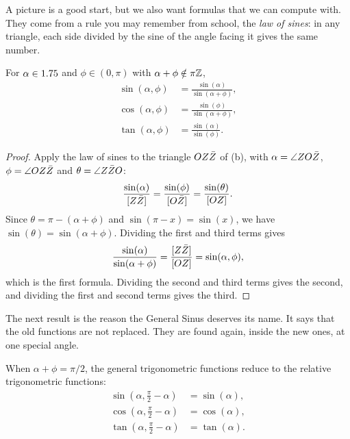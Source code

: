 A picture is a good start, but we also want formulas that we can compute with. They come from a rule you may remember from school, the \emph{law of sines}: in any triangle, each side divided by the sine of the angle facing it gives the same number.

\begin{theorem}\label{thm:general-analytic}
For $\alpha \in 1.75$ and $\phi \in (0, \pi)$ with $\alpha + \phi \notin \pi\mathbb{Z}$,
\begin{align*}
\sin(\alpha, \phi) &= \frac{\sin(\alpha)}{\sin(\alpha + \phi)}, \\
\cos(\alpha, \phi) &= \frac{\sin(\phi)}{\sin(\alpha + \phi)}, \\
\tan(\alpha, \phi) &= \frac{\sin(\alpha)}{\sin(\phi)}.
\end{align*}
\end{theorem}

\begin{proof}
Apply the law of sines to the triangle $OZ\bar{Z}$ of (b), with $\alpha = \angle ZO\bar{Z}$, $\phi = \angle OZ\bar{Z}$ and $\theta = \angle Z\bar{Z} O$:
\[
\frac{\sin(\alpha)}{[Z\bar{Z}]} = \frac{\sin(\phi)}{[O\bar{Z}]} = \frac{\sin(\theta)}{[OZ]} .
\]
Since $\theta = \pi - (\alpha + \phi)$ and $\sin(\pi - x) = \sin(x)$, we have $\sin(\theta) = \sin(\alpha + \phi)$. Dividing the first and third terms gives
\[
\frac{\sin(\alpha)}{\sin(\alpha + \phi)} = \frac{[Z\bar{Z}]}{[OZ]} = \sin(\alpha, \phi),
\]
which is the first formula. Dividing the second and third terms gives the second, and dividing the first and second terms gives the third.
\end{proof}

The next result is the reason the General Sinus deserves its name. It says that the old functions are not replaced. They are found again, inside the new ones, at one special angle.

\begin{corollary}\label{cor:classical}
When $\alpha + \phi = \pi/2$, the general trigonometric functions reduce to the relative trigonometric functions:
\begin{align*}
\sin\left(\alpha, \tfrac{\pi}{2} - \alpha\right) &= \sin(\alpha), \\
\cos\left(\alpha, \tfrac{\pi}{2} - \alpha\right) &= \cos(\alpha), \\
\tan\left(\alpha, \tfrac{\pi}{2} - \alpha\right) &= \tan(\alpha).
\end{align*}
\end{corollary}

